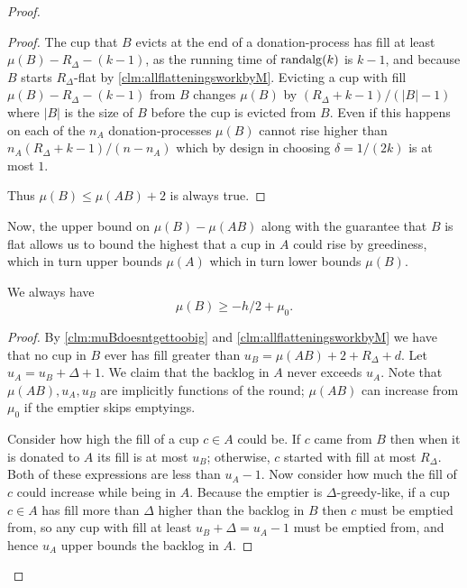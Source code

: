 \begin{proof}
\begin{proof}
  The cup that $B$ evicts at the end of a
  donation-process has fill at least $\mu(B) - R_\Delta -
  (k-1)$, as the running time of $\operatorname{\text{\textup{randalg}}}(k)$ is $k-1$, and
  because $B$ starts $R_\Delta$-flat by
  \cref{clm:allflatteningsworkbyM}. Evicting a cup
  with fill $\mu(B) - R_\Delta - (k -1)$ from $B$ changes
  $\mu(B)$ by $(R_\Delta + k - 1) / (|B|-1)$ where $|B|$ is the
  size of $B$ before the cup is evicted from $B$. Even if this
  happens on each of the $n_A$ donation-processes $\mu(B)$ cannot
  rise higher than $n_A (R_\Delta + k-1) / (n-n_A)$ which by
  design in choosing $\delta = 1/(2k)$ is at most $1$.

  Thus $\mu(B) \le \mu(AB) + 2$ is always true.

\end{proof}

Now, the upper bound on $\mu(B)-\mu(AB)$ along with the guarantee
that $B$ is flat allows us to bound the highest that a cup in $A$
could rise by greediness, which in turn upper bounds $\mu(A)$
which in turn lower bounds $\mu(B)$. 
\begin{clm}
  \label{clm:muBgreaterthanminushover2}
  We always have
  $$\mu(B) \ge -h/2 + \mu_0.$$
\end{clm}
\begin{proof}
  By \cref{clm:muBdoesntgettoobig} and \cref{clm:allflatteningsworkbyM} 
  we have that no cup in $B$ ever has fill greater than
  $u_B = \mu(A B) + 2 + R_\Delta + d$. 
  Let $u_A = u_B + \Delta + 1$. We claim that the backlog in $A$
  never exceeds $u_A$. Note that $\mu(AB), u_A, u_B$ are
  implicitly functions of the round; $\mu(AB)$ can increase from
  $\mu_0$ if the emptier skips emptyings.

  Consider how high the fill of a cup $c \in A$ could be.
  If $c$ came from $B$ then when it is donated
  to $A$ its fill is at most $u_B$; otherwise, $c$
  started with fill at most $R_\Delta$. Both of these expressions
  are less than $u_A - 1$. Now consider how
  much the fill of $c$ could increase while being in $A$. Because
  the emptier is $\Delta$-greedy-like, if a cup $c\in A$ has fill
  more than $\Delta$ higher than the backlog in $B$ then $c$ must
  be emptied from, so any cup with fill at least $u_B + \Delta =
  u_A - 1$ must be emptied from, and hence $u_A$ upper bounds the
  backlog in $A$. 


\end{proof}
\end{proof}
